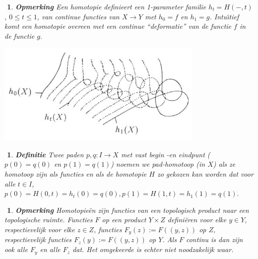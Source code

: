 \documentclass[12pt]{book}
\newtheorem{opmh}[stelh]{$\!\!$}
\newtheorem{dfh}[stelh]{$\!\!$}
\newenvironment{eopm}{\begin{opmh} \em {\bf Opmerking }}{\end{opmh}}
\newenvironment{df}{\begin{dfh} \em {\bf Definitie }}{\end{dfh}}
\begin{document}
\begin{eopm}
Een homotopie definieert een 1-parameter familie $h_{t}=H(-,t)$, $0\leq t \leq 1$, van continue
functies van $X\to Y$ met $h_0=f$ en $h_1=g$. 
Intu\"{\i}tief komt een homotopie overeen met een
continue ``deformatie'' van de functie $f$ in de functie $g$.
\end{eopm}

\begin{center}
\includegraphics[width=10cm]{images/homotopie.jpg}
\end{center}

\begin{df}
Twee paden $p,q:I\to X$ met vast begin -en eindpunt ($p(0)=q(0)$ en $p(1)=q(1)$) noemen we {\em pad-homotoop} (in $X$) als ze homotoop zijn als functies en als de homotopie $H$ zo gekozen kan worden dat voor alle $t\in I$, $p(0)=H(0,t)=h_t(0)=q(0), p(1)=H(1,t)=h_1(1)=q(1).$
\end{df}


\begin{eopm}
Homotopie\"en zijn functies van een topologisch product naar een topologische ruimte. Functies $F$ op een product $Y\times Z$ defini\"eren voor elke $y\in Y$, respectievelijk voor elke $z\in Z$, functies $F_y(z):=F((y,z))$ op $Z$, respectievelijk functies $F_z(y):=F((y,z))$ op $Y$. Als $F$ continu is dan zijn ook alle $F_y$ en alle $F_z$ dat. Het omgekeerde is echter niet noodzakelijk waar. 
\end{eopm}
\end{document}
